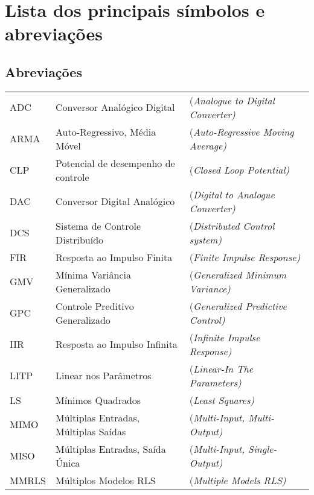 
\chapter{Lista dos principais símbolos e abreviações}

\section{Abreviações}

\begin{tabular}{ l l l }
ADC 	& Conversor Analógico Digital 			&(\it{Analogue to Digital Converter})   	\\ 
ARMA 	& Auto-Regressivo, Média Móvel 		&(\it{Auto-Regressive Moving Average})	\\ 
CLP	 	& Potencial de desempenho de controle	&(\it{Closed Loop Potential})	\\ 
DAC 	& Conversor  Digital Analógico			&(\it{Digital to Analogue Converter}) 		\\
DCS 	& Sistema de Controle Distribuído		& (\it{Distributed Control system}) 		\\
FIR 		& Resposta ao Impulso Finita 			&(\it{Finite Impulse Response})			\\
GMV		& Mínima Variância Generalizado		&(\it{Generalized Minimum Variance}) 	\\
GPC 	& Controle Preditivo Generalizado  		&(\it{Generalized Predictive Control})		\\
IIR 		& Resposta ao Impulso Infinita 			&(\it{Infinite Impulse Response})		\\ 
LITP 	& Linear nos Parâmetros 				&(\it{Linear-In The Parameters})  		\\ 
LS 		& Mínimos Quadrados 				&(\it{Least Squares})					\\ 
MIMO 	& Múltiplas Entradas, Múltiplas Saídas 	&(\it{Multi-Input, Multi-Output})			\\ 
MISO 	& Múltiplas Entradas, Saída Única 		&(\it{Multi-Input, Single-Output}) 		\\ 
MMRLS	& Múltiplos Modelos	RLS				&(\it{Multiple Models RLS}) 			\\ 

\end{tabular}
